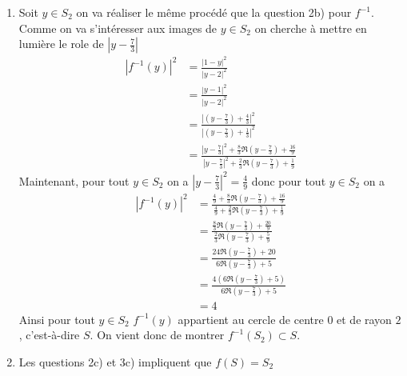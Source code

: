 \documentclass[a4paper, 11pt,reqno]{article}
\begin{document}
\begin{correction}
\begin{enumerate}
\begin{enumerate}
\item Soit $y\in S_2$ on va réaliser le même procédé que la question 2b) pour $f^{-1}$. Comme on va s'intéresser aux images de $y \in S_2$ on cherche à mettre en lumière le role de $|y-\frac{7}{3}|$
\begin{align*}
\left|f^{-1} (y) \right|^2 &=\frac{|1-y|^2}{|y-2|^2}\\
									&=\frac{|y-1|^2 }{|y-2|^2}	\\
									&=\frac{|(y-\frac{7}{3}) +\frac{4}{3}|^2 }{|(y-\frac{7}{3}) +\frac{1}{3}|^2}	\\
									&=\frac{|y-\frac{7}{3}|^2 +\frac{8}{3}\Re( y-\frac{7}{3}) + \frac{16}{9} }{|y-\frac{7}{3}|^2 +\frac{2}{3}\Re( y-\frac{7}{3}) + \frac{1}{9} }
\end{align*}
Maintenant, pour tout $y\in S_2$ on a $|y-\frac{7}{3}|^2 =\frac{4}{9}$ donc pour tout $y\in S_2$ on a 
\begin{align*}
\left|f^{-1} (y) \right|^2& = 
\frac{\frac{4}{9}+\frac{8}{3}\Re( y-\frac{7}{3}) + \frac{16}{9} }{\frac{4}{9} +\frac{2}{3}\Re( y-\frac{7}{3}) + \frac{1}{9} }\\
& = 
\frac{\frac{8}{3}\Re( y-\frac{7}{3}) + \frac{20}{9} }{\frac{2}{3}\Re( y-\frac{7}{3}) + \frac{5}{9} }\\
& = 
\frac{24\Re( y-\frac{7}{3}) + 20 }{6\Re( y-\frac{7}{3}) + 5 }\\
& = 
\frac{4(6\Re( y-\frac{7}{3}) + 5) }{6\Re( y-\frac{7}{3}) + 5 }\\
&=4
\end{align*}
Ainsi  pour tout $y\in S_2$  $f^{-1}(y)$ appartient au cercle de centre $0$ et de rayon $2$, c'est-à-dire $S$. 
On vient donc de montrer $f^{-1} (S_2)\subset S$. 
\item Les questions 2c) et 3c) impliquent que $f(S) =S_2$
\end{enumerate}
\end{enumerate}
\end{correction}
\end{document}

